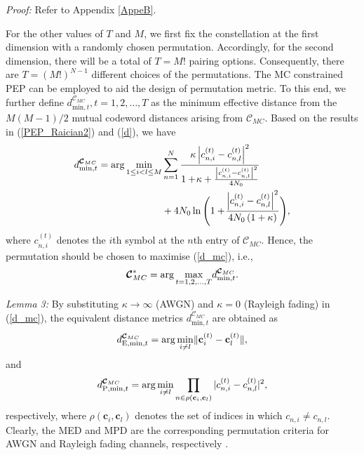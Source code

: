 \documentclass[journal]{IEEEtran}
\begin{document}
   \textit{Proof:}  Refer to Appendix \ref{AppeB}.
   

For the other values of $T$ and $M$, we first fix the constellation at the first dimension with a randomly chosen permutation.  Accordingly, for the second dimension, there will be a total of $T=M!$ pairing options. Consequently, there are $T= \left (M! \right)^{N-1}$  different choices of the permutations.  The  MC constrained PEP can be employed to aid the design of permutation metric. 
To this end,    we further define $d^{\boldsymbol {\mathcal C}_{MC}}_{\mathrm {min},t}, t=1,2,\ldots,T$ as the minimum effective  distance   from the $ M \left( M-1\right)/2$ mutual codeword distances   arising from   $ \boldsymbol {\mathcal C}_{MC} $.  Based on  the results in (\ref{PEP_Raician2}) and (\ref{d}), we have
\begin{equation}
\small
 \label{d_mc}
\begin{aligned} 
d^{\boldsymbol {\mathcal C}_{MC}}_{\mathrm {min},t}= \arg \underset {1 \leq i < l \leq M}{\min }       & \sum \limits _{n=1}^N   { \frac{ \kappa  \left|    c_{n,i}^{(t)}-c_{n,l}^{(t)}   \right |^2  }{1+ \! \kappa +\frac{\left|    c_{n,i}^{(t)}-c_{n,l}^{(t)}   \right |^2 }{4N_0} }    }  \\
  &+  4N_0   \ln \Bigg(1+ \! \frac{\left|    c_{n,i}^{(t)}-c_{n,l}^{(t)}   \right | ^2 }{4N_0 \left( 1+ \kappa\right)}   \Bigg),
\end{aligned}
  \end{equation}
 where $c_{n,i}^{(t)}$ denotes  the $i$th symbol at the $n$th entry of $\boldsymbol {\mathcal C}_{MC} $.    Hence, the permutation should be chosen to  maximise (\ref{d_mc}), i.e., 
 \begin{equation} 
   \small
\boldsymbol {\mathcal C}_{MC}^{\ast}=\arg \underset {t = 1,2,\ldots,T}{\max } d^{\boldsymbol {\mathcal C}_{MC}}_{\mathrm {min},t}.
\end{equation}

\textit{Lemma 3:}   By substituting $\kappa \rightarrow \infty$ (AWGN) and  $\kappa=0$ (Rayleigh fading) in (\ref{d_mc}), the equivalent distance metrics $d^{\boldsymbol {\mathcal C}_{MC}}_{\mathrm {min},t}$ are obtained  as  
\begin{equation} 
 \small
\label{dmin_mc}
d^{\boldsymbol {\mathcal C}_{MC}}_{  \mathrm {E, min},t}=\arg \underset {i\neq l}{\min }    \Arrowvert \mathbf {c}_{i}^{(t)}-\mathbf {c}_{l}^{(t)}\Arrowvert, 
\end{equation}
and
\begin{equation} 
 \small
d^{\boldsymbol {\mathcal C}_{MC}}_{\mathrm {P,min},t}=\arg \underset {i\neq l}{\min } \prod _{n \in \rho(\mathbf {c}_i, {\mathbf {c}}_l)} |c_{n,i}^{(t)}-c_{n,l}^{(t)}|^{2},
\end{equation}
respectively, where $\rho (\mathbf {c}_i, {\mathbf {c}}_l)$ denotes the set of  indices in which $ {c}_{n,i} \neq {{c}}_{n,l}$. Clearly, the MED and MPD are the corresponding permutation criteria  for AWGN  and Rayleigh fading channels, respectively \cite{chen2020design}.  
 
\end{document}
